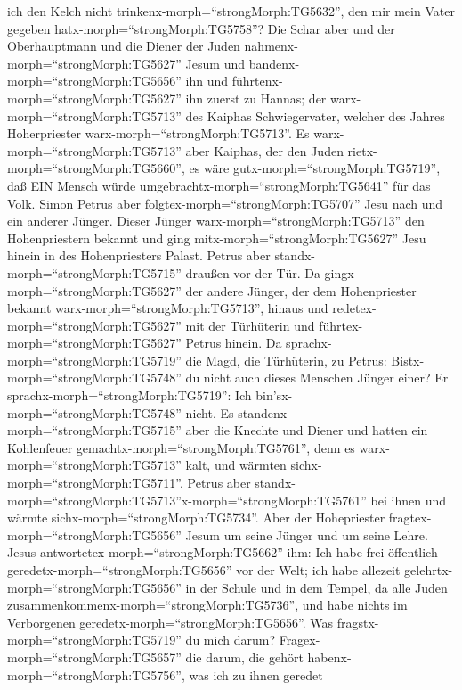 ich den Kelch nicht trinkenx-morph=``strongMorph:TG5632'', den mir mein
Vater gegeben hatx-morph=``strongMorph:TG5758''?  Die Schar
aber und der Oberhauptmann und die Diener der Juden
nahmenx-morph=``strongMorph:TG5627'' Jesum und
bandenx-morph=``strongMorph:TG5656'' ihn  und
führtenx-morph=``strongMorph:TG5627'' ihn zuerst zu Hannas; der
warx-morph=``strongMorph:TG5713'' des Kaiphas Schwiegervater, welcher
des Jahres Hoherpriester warx-morph=``strongMorph:TG5713''.
 Es warx-morph=``strongMorph:TG5713'' aber Kaiphas, der den
Juden rietx-morph=``strongMorph:TG5660'', es wäre
gutx-morph=``strongMorph:TG5719'', daß EIN Mensch würde
umgebrachtx-morph=``strongMorph:TG5641'' für das Volk. 
Simon Petrus aber folgtex-morph=``strongMorph:TG5707'' Jesu nach und ein
anderer Jünger. Dieser Jünger warx-morph=``strongMorph:TG5713'' den
Hohenpriestern bekannt und ging mitx-morph=``strongMorph:TG5627'' Jesu
hinein in des Hohenpriesters Palast.  Petrus aber
standx-morph=``strongMorph:TG5715'' draußen vor der Tür. Da
gingx-morph=``strongMorph:TG5627'' der andere Jünger, der dem
Hohenpriester bekannt warx-morph=``strongMorph:TG5713'', hinaus und
redetex-morph=``strongMorph:TG5627'' mit der Türhüterin und
führtex-morph=``strongMorph:TG5627'' Petrus hinein.  Da
sprachx-morph=``strongMorph:TG5719'' die Magd, die Türhüterin, zu
Petrus: Bistx-morph=``strongMorph:TG5748'' du nicht auch dieses Menschen
Jünger einer? Er sprachx-morph=``strongMorph:TG5719'': Ich
bin'sx-morph=``strongMorph:TG5748'' nicht.  Es
standenx-morph=``strongMorph:TG5715'' aber die Knechte und Diener und
hatten ein Kohlenfeuer gemachtx-morph=``strongMorph:TG5761'', denn es
warx-morph=``strongMorph:TG5713'' kalt, und wärmten
sichx-morph=``strongMorph:TG5711''. Petrus aber
standx-morph=``strongMorph:TG5713''x-morph=``strongMorph:TG5761'' bei
ihnen und wärmte sichx-morph=``strongMorph:TG5734''.  Aber
der Hohepriester fragtex-morph=``strongMorph:TG5656'' Jesum um seine
Jünger und um seine Lehre.  Jesus
antwortetex-morph=``strongMorph:TG5662'' ihm: Ich habe frei öffentlich
geredetx-morph=``strongMorph:TG5656'' vor der Welt; ich habe allezeit
gelehrtx-morph=``strongMorph:TG5656'' in der Schule und in dem Tempel,
da alle Juden zusammenkommenx-morph=``strongMorph:TG5736'', und habe
nichts im Verborgenen geredetx-morph=``strongMorph:TG5656''.
 Was fragstx-morph=``strongMorph:TG5719'' du mich darum?
Fragex-morph=``strongMorph:TG5657'' die darum, die gehört
habenx-morph=``strongMorph:TG5756'', was ich zu ihnen geredet

